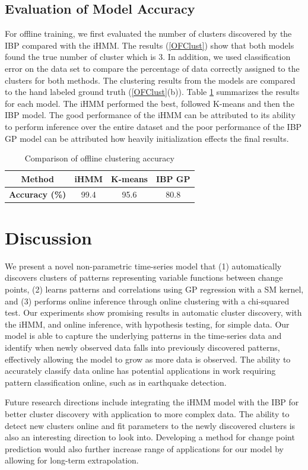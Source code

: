 \documentclass{article}
\begin{document}
\subsection{Evaluation of Model Accuracy}

For offline training, we first evaluated the number of clusters discovered by the IBP compared with the iHMM. The results (\ref{OFClust}) show that both models found the true number of cluster which is 3. In addition, we used classification error on the data set to compare the percentage of data correctly assigned to the clusters for both methods. The clustering results from the models are compared to the hand labeled ground truth (\ref{OFClust}(b)). Table \ref{OFACC} summarizes the results for each model. The iHMM performed the best, followed K-means and then the IBP model. The good performance of the iHMM can be attributed to its ability to perform inference over the entire dataset and the poor performance of the IBP GP model can be attributed how heavily initialization effects the final results.

\begin{table}[]
\centering
\caption{Comparison of offline clustering accuracy}
\label{OFACC}
\begin{tabular}{|c|c|c|c|}
\hline
\textbf{Method}        & iHMM & K-means & IBP GP \\ \hline
\textbf{Accuracy (\%)} & 99.4 & 95.6    & 80.8   \\ \hline
\end{tabular}
\end{table}

\section{Discussion}

We present a novel non-parametric time-series model that (1) automatically discovers clusters of patterns representing variable functions between change points, (2) learns patterns and correlations using GP regression with a SM kernel, and (3) performs online inference through online clustering with a chi-squared test. Our experiments show promising results in automatic cluster discovery, with the iHMM, and online inference, with hypothesis testing, for simple data. Our model is able to capture the underlying patterns in the time-series data and identify when newly observed data falls into previously discovered patterns, effectively allowing the model to grow as more data is observed. The ability to accurately classify data online has potential applications in work requiring pattern classification online, such as in earthquake detection.

Future research directions include integrating the iHMM model with the IBP for better cluster discovery with application to more complex data. The ability to detect new clusters online and fit parameters to the newly discovered clusters is also an interesting direction to look into. Developing a method for change point prediction would also further increase range of applications for our model by allowing for long-term extrapolation.



\end{document}
